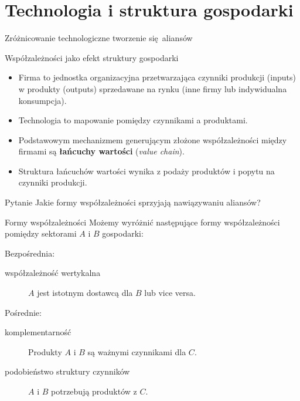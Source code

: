 \documentclass{beamer}
\renewcommand{\emph}[1]{\textbf{#1}}
\begin{document}
\section{Technologia i struktura gospodarki}

\begin{frame}
	\begin{center}
		\begin{Huge}
			Zróżnicowanie technologiczne tworzenie się aliansów
		\end{Huge}
	\end{center}
\end{frame}

\begin{frame}{Współzależności jako efekt struktury gospodarki}

	\begin{itemize}
		\item Firma to jednostka organizacyjna przetwarzająca czynniki produkcji
			(inputs) w produkty (outputs) sprzedawane na rynku (inne firmy lub
			indywidualna konsumpcja).

		\item Technologia to mapowanie pomiędzy czynnikami a produktami.

		\item Podstawowym mechanizmem generującym złożone współzależności między
			firmami są \emph{łańcuchy wartości} (\textit{value chain}).

		\item Struktura łańcuchów wartości wynika z podaży produktów i popytu na
			czynniki produkcji.
	\end{itemize}

	\begin{block}{Pytanie}
		Jakie formy współzależności sprzyjają nawiązywaniu aliansów?
	\end{block}
\end{frame}


\begin{frame}{Formy współzależności}
	Możemy wyróżnić następujące formy współzależności pomiędzy sektorami $A$ i
	$B$ gospodarki:

	\bigskip

	Bezpośrednia:
	\begin{description}
		\item[współzależność wertykalna] $A$ jest istotnym dostawcą dla $B$ lub vice versa.
	\end{description}

	Pośrednie:
	\begin{description}
		\item[komplementarność] Produkty $A$ i $B$ są ważnymi czynnikami dla $C$.
		\item[podobieństwo struktury czynników] $A$ i $B$ potrzebują produktów z $C$.
		\end{description}
\end{frame}
\end{document}
